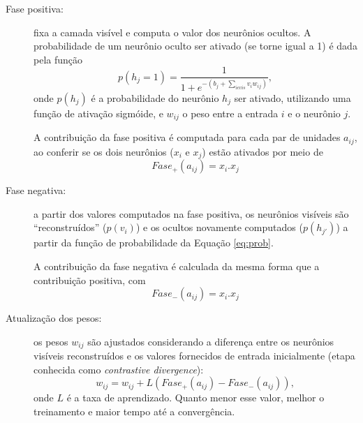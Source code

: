 \begin{description}
\item [Fase positiva:] fixa a camada visível e computa o valor dos neurônios ocultos. A probabilidade de um neurônio oculto ser ativado (se torne igual a 1) é dada pela função
\begin{equation}
p(h_j = 1) = \frac{1}{1+e^{-(b_j+\sum_{i\epsilon vis}{v_iw_{ij}})}},
\label{eq:prob}
\end{equation}
\noindent onde $p(h_{j})$ é a probabilidade do neurônio $h_j$ ser ativado, utilizando uma função de ativação sigmóide, e $w_{ij}$ o peso entre a entrada $i$ e o neurônio $j$.

A contribuição da fase positiva é computada para cada par de unidades $a_{ij}$, ao conferir se os dois neurônios ($x_i$ e $x_j$) estão ativados por meio de
\begin{equation*}
Fase_{+}(a_{ij}) = x_i . x_j
\end{equation*}

\item [Fase negativa:] a partir dos valores computados na fase positiva, os neurônios visíveis são ``reconstruídos'' ($p(v_i)$) e os ocultos novamente computados ($p(h_{j'})$) a partir da função de probabilidade da Equação \eqref{eq:prob}.


A contribuição da fase negativa é calculada da mesma forma que a contribuição positiva, com
\begin{equation*}
Fase_{-}(a_{ij}) = x_i . x_j
\end{equation*}

\item [Atualização dos pesos:] os pesos $w_{ij}$ são ajustados considerando a diferença entre os neurônios visíveis reconstruídos e os valores fornecidos de entrada inicialmente (etapa conhecida como \textit{contrastive divergence}):
\begin{equation*}
w_{ij} = w_{ij} + L (Fase_{+}(a_{ij}) - Fase_{-}(a_{ij})),
\end{equation*}
\noindent onde $L$ é a taxa de aprendizado. Quanto menor esse valor, melhor o treinamento e maior tempo até a convergência.
\end{description}




